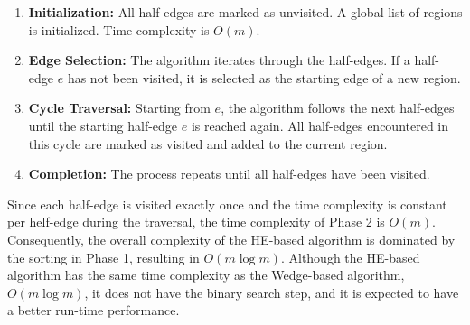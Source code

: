 \begin{enumerate}
    \item \textbf{Initialization:} All half-edges are marked as unvisited. A global list of regions is initialized. Time complexity is $O(m)$.
    \item \textbf{Edge Selection:} The algorithm iterates through the half-edges. If a half-edge $e$ has not been visited, it is selected as the starting edge of a new region.
    \item \textbf{Cycle Traversal:} Starting from $e$, the algorithm follows the next half-edges until the starting half-edge $e$ is reached again. All half-edges encountered in this cycle are marked as visited and added to the current region.
    \item \textbf{Completion:} The process repeats until all half-edges have been visited. 
\end{enumerate}

Since each half-edge is visited exactly once and the time complexity is constant per helf-edge during the traversal, the time complexity of Phase 2 is $O(m)$. Consequently, the overall complexity of the HE-based algorithm is dominated by the sorting in Phase 1, resulting in $O(m \log m)$. Although the HE-based algorithm has the same time complexity as the Wedge-based algorithm, $O(m \log m)$, it does not have the binary search step, and it is expected to have a better run-time performance.